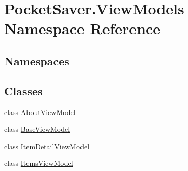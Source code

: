 \hypertarget{namespace_pocket_saver_1_1_view_models}{}\section{Pocket\+Saver.\+View\+Models Namespace Reference}
\label{namespace_pocket_saver_1_1_view_models}
\subsection*{Namespaces}
\begin{DoxyCompactItemize}
\end{DoxyCompactItemize}
\subsection*{Classes}
\begin{DoxyCompactItemize}
\item 
class \hyperlink{class_pocket_saver_1_1_view_models_1_1_about_view_model}{About\+View\+Model}
\item 
class \hyperlink{class_pocket_saver_1_1_view_models_1_1_base_view_model}{Base\+View\+Model}
\item 
class \hyperlink{class_pocket_saver_1_1_view_models_1_1_item_detail_view_model}{Item\+Detail\+View\+Model}
\item 
class \hyperlink{class_pocket_saver_1_1_view_models_1_1_items_view_model}{Items\+View\+Model}
\end{DoxyCompactItemize}
